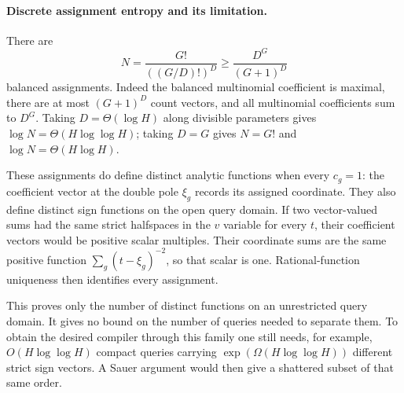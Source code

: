 \documentclass[11pt]{article}
\begin{document}
\paragraph{Discrete assignment entropy and its limitation.}
There are
\[
 N=\frac{G!}{((G/D)!)^D}
 \geq \frac{D^G}{(G+1)^D}                       \tag{4}
\]
balanced assignments. Indeed the balanced multinomial coefficient is
maximal, there are at most $(G+1)^D$ count vectors, and all multinomial
coefficients sum to $D^G$. Taking $D=\Theta(\log H)$ along divisible
parameters gives $\log N=\Theta(H\log\log H)$; taking $D=G$ gives
$N=G!$ and $\log N=\Theta(H\log H)$.

These assignments do define distinct analytic functions when every
$c_g=1$: the coefficient vector at the double pole $\xi_g$ records its
assigned coordinate. They also define distinct sign functions on the
open query domain. If two vector-valued sums had the same strict
halfspaces in the $v$ variable for every $t$, their coefficient vectors
would be positive scalar multiples. Their coordinate sums are the
same positive function $\sum_g(t-\xi_g)^{-2}$, so that scalar is one.
Rational-function uniqueness then identifies every assignment.

This proves only the number of distinct functions on an unrestricted
query domain. It gives no bound on the number of queries needed to
separate them. To obtain the desired compiler through this family one
still needs, for example, $O(H\log\log H)$ compact queries carrying
$\exp(\Omega(H\log\log H))$ different strict sign vectors. A Sauer
argument would then give a shattered subset of that same order.
\end{document}
